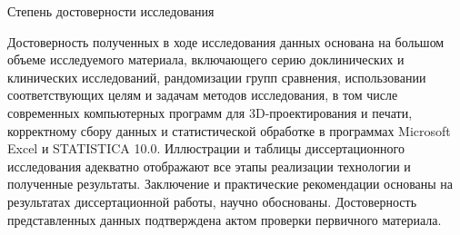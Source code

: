 
        Степень достоверности исследования


        Достоверность полученных в ходе исследования данных основана на
большом объеме исследуемого материала, включающего серию доклинических и
клинических исследований, рандомизации групп сравнения, использовании
соответствующих целям и задачам методов исследования, в том числе
современных компьютерных программ для 3D-проектирования и печати,
корректному сбору данных и статистической обработке в программах Microsoft
Excel    и   STATISTICA 10.0.    Иллюстрации      и   таблицы   диссертационного
исследования адекватно отображают все этапы реализации технологии и
полученные результаты. Заключение и практические рекомендации основаны на
результатах диссертационной работы, научно обоснованы. Достоверность
представленных данных подтверждена актом проверки первичного материала.
